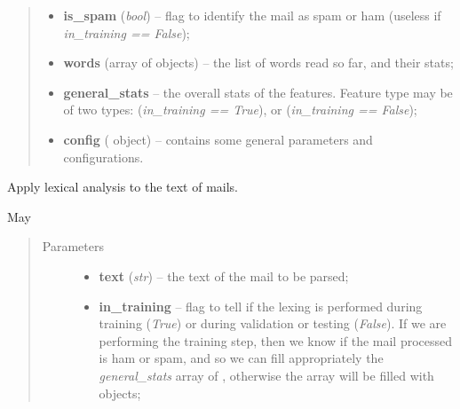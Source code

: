 \documentclass[letterpaper,10pt,english]{sphinxmanual}
\begin{document}
\begin{fulllineitems}
\begin{fulllineitems}
\begin{quote}
\begin{description}
\begin{itemize}
\item {} 
\textbf{is\_spam} (\emph{bool}) -- flag to identify the mail as spam or ham (useless if             \emph{in\_training == False});

\item {} 
\textbf{words} (array of {\hyperref[index:gen_stat.Word]{}} objects) -- the list of words read so far, and their stats;

\item {} 
\textbf{general\_stats} -- the overall stats of the features. Feature type may be            of two types:                {\hyperref[index:gen_stat.Stat]{}} (\emph{in\_training == True}), or                 (\emph{in\_training == False});

\item {} 
\textbf{config} ({\hyperref[index:config.Config]{}} object) -- contains some general parameters and configurations.

\end{itemize}

\end{description}\end{quote}

\end{fulllineitems}


\begin{fulllineitems}
\label{index:lexer.Lexer.lexer_words}
Apply lexical analysis to the text of mails.

May
\begin{quote}\begin{description}
\item[{Parameters}] \leavevmode\begin{itemize}
\item {} 
\textbf{text} (\emph{str}) -- the text of the mail to be parsed;

\item {} 
\textbf{in\_training} -- flag to tell if the lexing is performed during training            (\emph{True}) or during validation or testing (\emph{False}). If we are performing            the training step, then we know if the mail processed is ham or spam, and
so we can fill appropriately the \emph{general\_stats} array of
{\hyperref[index:gen_stat.Stat]{}}, otherwise the array will be filled with
 objects;


\end{itemize}
\end{description}
\end{quote}
\end{fulllineitems}
\end{fulllineitems}
\end{document}
